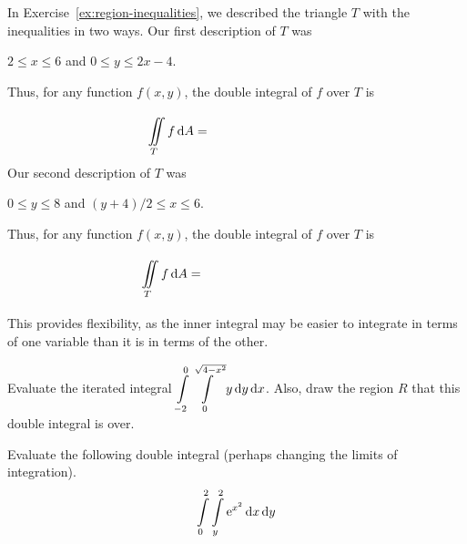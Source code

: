 \begin{example}
    In Exercise~\ref{ex:region-inequalities}, we described the triangle $T$ with the inequalities in two ways.
    Our first description of $T$ was
    \begin{center}
        $2\le x\le 6$ \quad and \quad  $0\le y\le 2x-4$.
    \end{center}
    Thus, for any function $f(x,y)$, the double integral of $f$ over $T$ is
    \[\iint\limits_T f\dA = \phantom{\int\limits_2^6 \int\limits_0^{2x-4} f(x,y)\dy\dx.}\]
    Our second description of $T$ was
    \begin{center}
        $0\le y\le 8$ \quad and \quad $(y+4)/2\le x\le 6$.
    \end{center}
    Thus, for any function $f(x,y)$, the double integral of $f$ over $T$ is 
    \[\iint\limits_T f\dA = \phantom{\int\limits_0^8 \int\limits_{(y+4)/2}^6 f(x,y)\dx\dy.}\]
    
    This provides flexibility, as the inner integral may be easier to integrate in terms of one variable than it is in terms of the other.
\end{example}
\pagebreak 
\begin{ex}
    Evaluate the iterated integral $\displaystyle\int\limits_{-2}^0\int\limits_{0}^{\sqrt{4-x^2}} y\mathop{}\!\mathrm{d} y \mathop{}\!\mathrm{d} x$. Also, draw the region $R$ that this double integral is over.
\end{ex}
\vfill 

\begin{ex}
    Evaluate the following double integral (perhaps changing the limits of integration).
    \[
        \int\limits_0^2\int\limits_y^2 \mathrm{e}^{x^2}\mathop{}\!\mathrm{d} x\mathop{}\!\mathrm{d} y
    \]
\end{ex}


\vfill
